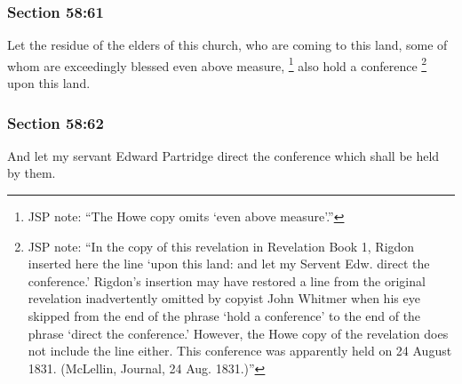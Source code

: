 
	\subsubsection{Section 58:61} %
		\label{DC58-61}

		Let the residue of the elders of this church, who are coming to this land, some of whom are exceedingly blessed even above measure,%
			\footnote{%
				JSP note: ``The Howe copy omits `even above measure'.''
				}
		also hold a conference%
			\footnote{%
				JSP note: ``In the copy of this revelation in Revelation Book 1, Rigdon inserted here the line `upon this land: and let my Servent Edw. direct the conference.' Rigdon's insertion may have restored a line from the original revelation inadvertently omitted by copyist John Whitmer when his eye skipped from the end of the phrase `hold a conference' to the end of the phrase `direct the conference.' However, the Howe copy of the revelation does not include the line either. This conference was apparently held on 24 August 1831. (McLellin, Journal, 24 Aug. 1831.)''
				}
		upon this land.


	\subsubsection{Section 58:62} %
		\label{DC58-62}

		And let my servant Edward Partridge direct the conference which shall be held by them.


